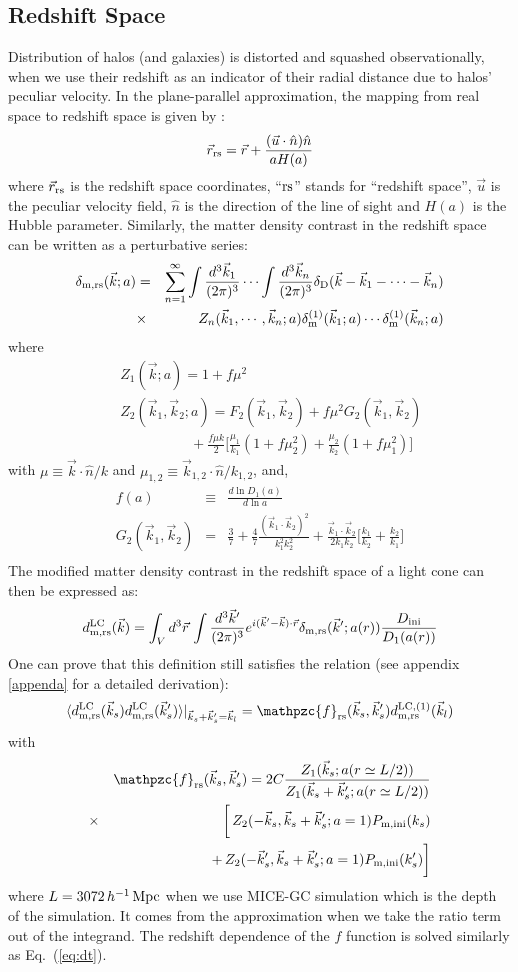 \documentclass[prd,amsmath,amssymb,floatfix,superscriptaddress,nofootinbib,twocolumn]{revtex4-1}
\def\be{\begin{equation}}
\def\ee{\end{equation}}
\def\bea{\begin{eqnarray}}
\def\eea{\end{eqnarray}}
\newcommand{\m}{\rm m}
\newcommand{\rs}{\rm rs}
\newcommand{\LC}{\rm LC}
\newcommand{\ini}{\rm ini}
\newcommand{\vrr}{\vec{r}}
\newcommand{\vs}{\nonumber\\}
\newcommand{\vk}{\vec{k}}
\newcommand{\ec}[1]{Eq.~(\ref{eq:#1})}
\newcommand{\eql}[1]{\label{eq:#1}}
\begin{document}
\subsection{Redshift Space} \label{sec7}
Distribution of halos (and galaxies) is distorted and squashed observationally, when we use their redshift as an indicator of their radial distance due to halos' peculiar velocity. In the plane-parallel approximation, the mapping from real space to redshift space is given by \cite{Bernardeau:2002rev}:
\be 
\vrr_{\rs} = \vrr + \frac{(\vec{u}\cdot \hat{n})\hat{n}}{aH(a)}
\ee 
where $\vrr_{\rs}$ is the redshift space coordinates, ``$\rs$'' stands for ``redshift space'', $\vec{u}$ is the peculiar velocity field, $\hat{n}$ is the direction of the line of sight and $H(a)$ is the Hubble parameter. Similarly, the matter density contrast in the redshift space can be written as a perturbative series:
\bea 
\delta_{\m,\rs}(\vk;a)&=&\sum_{n=1}^{\infty} \int\frac{d^3 \vk_1}{(2\pi)^3} \cdots \int \frac{d^3 \vk_n}{(2\pi)^3} \delta_{\rm D}(\vk-\vk_1 - \cdots -\vk_n) \nonumber \\
&\times & Z_n (\vk_1,\cdots,\vk_n;a)\delta_{\m}^{(1)}(\vk_1;a)\cdots \delta_{\m}^{(1)}(\vk_n;a) \eql{rspt} \vs
\eea
where 
\bea 
&&Z_1(\vk;a)=1+f\mu^2 \\ 
&&Z_2(\vk_1,\vk_2;a)=F_{2}(\vk_1,\vk_2)+f\mu^2 G_2(\vk_1,\vk_2)\vs 
&&\qquad \qquad\quad+\frac{f\mu k}{2}\bigg[ \frac{\mu_1}{k_1}(1+f\mu_2^2)+\frac{\mu_2}{k_2}(1+f\mu_1^2)\bigg]
\eea 
with $\mu \equiv \vk \cdot \hat{n}/k$ and $\mu_{1,2} \equiv \vk_{1,2} \cdot \hat{n}/k_{1,2}$, and,
\bea 
f(a)&\equiv & \frac{d \ln D_{1}(a)}{d \ln a}\\
G_2(\vk_1,\vk_2)&=&\frac{3}{7}+\frac{4}{7}\frac{(\vk_1\cdot \vk_2)^2}{k_1^2 k_2^2}+\frac{\vk_1\cdot \vk_2}{2k_1k_2}\bigg[\frac{k_1}{k_2}+\frac{k_2}{k_1}\bigg]\vs
\eea 
The modified matter density contrast in the redshift space of a light cone can then be expressed as: 
\be 
d^{\LC}_{\rm m,\rs}(\vk)=\int_{V} d^3\vrr  \, \int \frac{d^3 \vk'}{(2\pi)^3}e^{i(\vk'-\vk)\cdot\vrr}\delta_{\rm m,\rs}(\vk';a(r))\frac{D_{\ini}}{D_{1}(a(r))} 
\ee 
One can prove that this definition still satisfies the relation (see appendix \ref{appenda} for a detailed derivation):
\be 
\langle d^{\LC}_{\rm m,\rs }(\vk_s)d^{\LC}_{\rm m,\rs }(\vk_s') \rangle|_{\vk_s+\vk_s'=\vk_l} =\mathpzc{f}_{\rs}(\vec{k}_s,\vec{k}_s'){d}^{\rm LC,(1)}_{\rm m,\rs}(\vec{k}_l) \eql{2ptddrs}
\ee 
with 
\bea
&&\mathpzc{f}_{\rs}(\vec{k}_s,\vec{k}_s')=2C\frac{Z_{1}(\vk_s;a(r\simeq L/2 ))}{Z_{1}(\vk_s+\vk_s';a(r\simeq L/2 ))}\vs
&\times&\bigg[\,Z_2(-\vec{k}_s,\vec{k}_s+\vec{k}_s';a=1)P_{\rm m,ini}(k_s)\vs
&&+\,Z_2(-\vec{k}_s',\vec{k}_s+\vec{k}_s';a=1)P_{\rm m,ini}(k_s')\bigg]  \vs   
\eea 
where $L=3072\, h^{-1}\, \rm Mpc$ when we use MICE-GC simulation which is the depth of the simulation. It comes from the approximation when we take the ratio term out of the integrand. The redshift dependence of the $f$ function is solved similarly as \ec{dt}. 
\end{document}
